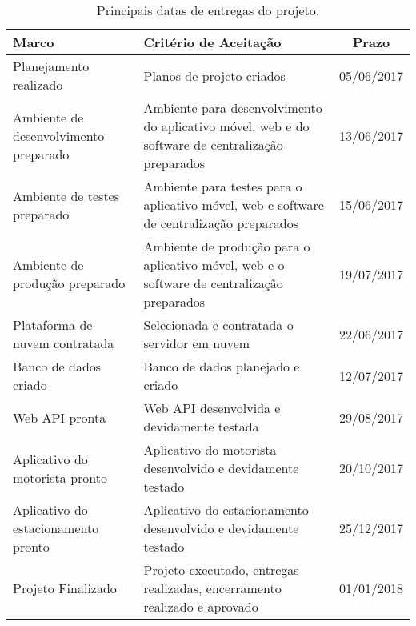 \begin{table}[h]
	\begin{tabularx}{1.1\textwidth}{| X | X | c |}
		\hline
		\textbf{Marco}                        & \textbf{Critério de Aceitação}                                                                   & \textbf{Prazo} \\
		\hline
		Planejamento realizado                & Planos de projeto criados                                                                           & 05/06/2017     \\
		\hline
		Ambiente de desenvolvimento preparado & Ambiente para desenvolvimento do aplicativo móvel, web e do software de centralização preparados & 13/06/2017     \\
		\hline
		Ambiente de testes preparado          & Ambiente para testes para o aplicativo móvel, web e software de centralização preparados         & 15/06/2017     \\
		\hline
		Ambiente de produção preparado      & Ambiente de produção para o aplicativo móvel, web e o software de centralização preparados     & 19/07/2017     \\
		\hline
		Plataforma de nuvem contratada        & Selecionada e contratada o servidor em nuvem                                                        & 22/06/2017     \\
		\hline
		Banco de dados criado                 & Banco de dados planejado e criado                                                                   & 12/07/2017     \\
		\hline
		Web API pronta                        & Web API desenvolvida e devidamente testada                                                          & 29/08/2017     \\
		\hline
		Aplicativo do motorista pronto        & Aplicativo do motorista desenvolvido e devidamente testado                                          & 20/10/2017     \\
		\hline
		Aplicativo do estacionamento pronto   & Aplicativo do estacionamento desenvolvido e devidamente testado                                     & 25/12/2017     \\
		\hline
		Projeto Finalizado                    & Projeto executado, entregas realizadas, encerramento realizado e aprovado                           & 01/01/2018     \\
		\hline
	\end{tabularx}
	\centering
	\caption{Principais datas de entregas do projeto.}
	\label{tab:entregas}
\end{table}


